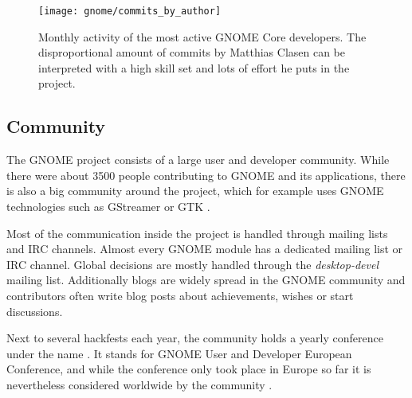 \vfill
\begin{figure}[htbp]
  \centering
  \texttt{[image: gnome/commits\_by\_author]}
  \caption[Commits by Most Active Authors, GNOME]
  {Monthly activity of the most active GNOME Core developers. The
    disproportional amount of commits by Matthias Clasen can be interpreted
    with a high skill set and lots of effort he puts in the project.}
  \label{fig:gnome:cba}
\end{figure}


\subsection{Community} %

The GNOME project consists of a large user and developer community. While there
were about 3500 people contributing to GNOME and its applications, there is
also a big community around the project, which for example uses GNOME
technologies such as GStreamer or \ac{GTK} \cite{GNOMEAbout,GNOMETeams}.

Most of the communication inside the project is handled through mailing lists
and \ac{IRC} channels. Almost every GNOME module has a dedicated mailing list
or \ac{IRC} channel. Global decisions are mostly handled through the
\emph{desktop-devel} mailing list. Additionally blogs are widely spread in the
GNOME community and contributors often write blog posts about achievements,
wishes or start discussions.

Next to several hackfests each year, the community holds a yearly conference
under the name . It stands for GNOME User and Developer
European Conference, and while the conference only took place in Europe so far
it is nevertheless considered worldwide by the community \cite{GNOMEGUADEC}.

